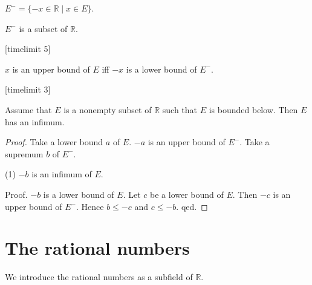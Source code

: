 \documentclass{article}
\begin{document}
\begin{forthel}
\begin{definition}
$E^- = \{-x \in \mathbb{R} \mid x \in E\}$.
\end{definition}

\begin{lemma}
$E^-$ is a subset of $\mathbb{R}$.
\end{lemma}
[timelimit 5]
\begin{lemma}
$x$ is an upper bound of $E$ iff $-x$ is a lower bound of $E^-$.
\end{lemma}
[timelimit 3]

\begin{theorem} Assume that $E$ is a nonempty subset of $\mathbb{R}$
such that $E$ is bounded below.
Then $E$ has an infimum.\end{theorem}
\begin{proof}
Take a lower bound $a$ of $E$.
$-a$ is an upper bound of $E^-$.
Take a supremum $b$ of $E^-$.

(1) $-b$ is an infimum of $E$.

Proof.
$-b$ is a lower bound of $E$. 
Let $c$ be a lower bound of $E$.
Then $-c$ is an upper bound of $E^-$.
Hence $b \leq -c$ and $c \leq -b$. 
qed.
\end{proof}
\end{forthel}


\section{The rational numbers}

We introduce the rational numbers
as a subfield of $\mathbb{R}$.
\end{document}
